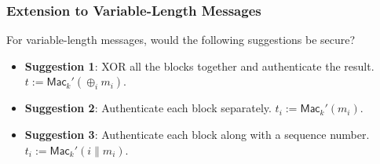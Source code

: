 \begin{frame}\frametitle{Extension to Variable-Length Messages}
\begin{exampleblock}{For variable-length messages, would the following suggestions be secure?}
\begin{itemize}
\item \textbf{Suggestion 1}: XOR all the blocks together and authenticate the result. $t := \mathsf{Mac}_k'(\oplus_i m_i)$.
\item \textbf{Suggestion 2}: Authenticate each block separately. $t_i := \mathsf{Mac}_k'(m_i)$.
\item \textbf{Suggestion 3}: Authenticate each block along with a sequence number. $t_i := \mathsf{Mac}_k'(i\| m_i)$.
\end{itemize}
\end{exampleblock}
\end{frame}
